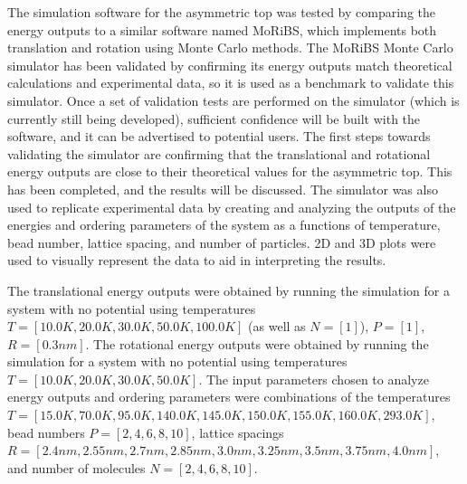\documentclass[11pt]{article}
\begin{document}
The simulation software for the asymmetric top was tested by comparing the energy outputs to a similar software named MoRiBS, which implements both translation and rotation using Monte Carlo methods. The MoRiBS Monte Carlo simulator has been validated by confirming its energy outputs match theoretical calculations and experimental data, so it is used as a benchmark to validate this simulator. Once a set of validation tests are performed on the simulator (which is currently still being developed), sufficient confidence will be built with the software, and it can be advertised to potential users. The first steps towards validating the simulator are confirming that the translational and rotational energy outputs are close to their theoretical values for the asymmetric top. This has been completed, and the results will be discussed. The simulator was also used to replicate experimental data by creating and analyzing the outputs of the energies and ordering parameters of the system as a functions of temperature, bead number, lattice spacing, and number of particles. 2D and 3D plots were used to visually represent the data to aid in interpreting the results.

The translational energy outputs were obtained by running the simulation for a system with no potential using temperatures \begin{math} T = [10.0 K, 20.0 K, 30.0 K, 50.0 K, 100.0 K] \end{math} (as well as \begin{math} N = [1] \end{math}), \begin{math} P = [1] \end{math}, \begin{math} R = [0.3 nm] \end{math}. The rotational energy outputs were obtained by running the simulation for a system with no potential using temperatures \begin{math} T = [10.0 K, 20.0 K, 30.0 K, 50.0 K] \end{math}. The input parameters chosen to analyze energy outputs and ordering parameters were combinations of the temperatures \begin{math} T = [15.0 K, 70.0 K, 95.0 K, 140.0 K, 145.0 K, 150.0 K, 155.0 K, 160.0 K, 293.0 K] \end{math}, bead numbers \begin{math} P = [2, 4, 6, 8, 10] \end{math}, lattice spacings \begin{math} R = [2.4 nm, 2.55 nm, 2.7 nm, 2.85 nm, 3.0 nm, 3.25 nm, 3.5 nm, 3.75 nm,  4.0 nm]  \end{math}, and number of molecules \begin{math} N = [2, 4, 6, 8, 10] \end{math}.
\end{document}
